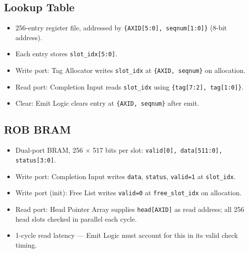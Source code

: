 \subsection{Lookup Table}
\begin{itemize}[noitemsep]
  \item 256-entry register file, addressed by \texttt{\{AXID[5:0], seqnum[1:0]\}} (8-bit address).
  \item Each entry stores \texttt{slot\_idx[5:0]}.
  \item Write port: Tag Allocator writes \texttt{slot\_idx} at \texttt{\{AXID, seqnum\}} on allocation.
  \item Read port: Completion Input reads \texttt{slot\_idx} using \texttt{\{tag[7:2], tag[1:0]\}}.
  \item Clear: Emit Logic clears entry at \texttt{\{AXID, seqnum\}} after emit.
\end{itemize}

\subsection{ROB BRAM}
\begin{itemize}[noitemsep]
  \item Dual-port BRAM, 256 $\times$ 517 bits per slot: \texttt{valid[0], data[511:0], status[3:0]}.
  \item Write port: Completion Input writes \texttt{data}, \texttt{status}, \texttt{valid=1} at \texttt{slot\_idx}.
  \item Write port (init): Free List writes \texttt{valid=0} at \texttt{free\_slot\_idx} on allocation.
  \item Read port: Head Pointer Array supplies \texttt{head[AXID]} as read address; all 256 head slots checked in parallel each cycle.
  \item 1-cycle read latency — Emit Logic must account for this in its valid check timing.
\end{itemize}

